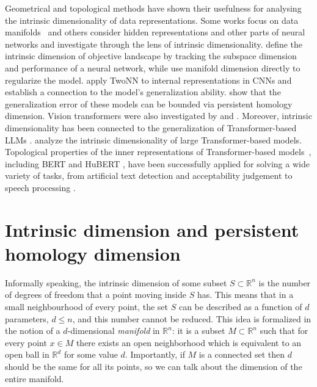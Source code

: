 \documentclass{article}
\begin{document}
Geometrical and topological methods have shown their usefulness for analysing the intrinsic dimensionality of data representations. Some works focus on data manifolds~\citep{pope2021the, NEURIPS2021_3bc31a43} and others consider hidden representations and other parts of neural networks and investigate through the lens of intrinsic dimensionality. \citet{measuringIDlandscape} define the intrinsic dimension of objective landscape by tracking the subspace dimension and performance of a neural network, while \citet{8578388} use manifold dimension directly to regularize the model.  \citet{ansuini2019intrinsic} apply TwoNN to internal representations in CNNs and establish a connection to the model's generalization ability. \citet{birdal2021intrinsic} show that the generalization error of these models can be bounded via persistent homology dimension. 
Vision transformers were also investigated by \citet{xue2022searching} and \citet{magai2022topology}.  
Moreover, intrinsic dimensionality has been connected to the generalization of Transformer-based LLMs \citep{aghajanyan-etal-2021-intrinsic}. \citet{Valeriani-et-al-2023} analyze the intrinsic dimensionality of large Transformer-based models.
Topological properties of the inner representations of Transformer-based models~\citep{NIPS2017_3f5ee243}, including BERT \citep{devlin-etal-2019-bert} and HuBERT \citep{hubert_paper}, have been successfully applied for solving a wide variety of tasks, from artificial text detection \citep{kushnareva-etal-2021-artificial} and acceptability judgement \citep{cherniavskii-etal-2022-acceptability} to speech processing \citep{tulchinskii2022topological}.


\section{Intrinsic dimension and persistent homology dimension}\label{sec:id}



Informally speaking, the intrinsic dimension of some subset $S\subset\mathbb{R}^n$ is the number of degrees of freedom that a point moving inside $S$ has. This means that in a small neighbourhood of every point, the set $S$ can be described as a function of $d$ parameters, $d\le n$, and this number cannot be reduced. 
This idea is formalized 
in the notion of a $d$-dimensional \textit{manifold} in $\mathbb{R}^n$: it is a subset $M\subset\mathbb{R}^n$ such that for every point $x\in M$ there exists an open neighborhood which is equivalent to an open ball in $\mathbb{R}^d$ for some value $d$. Importantly, if $M$ is a connected set then $d$ should be the same for all its points, so we can talk about the dimension of the entire manifold.
\end{document}
